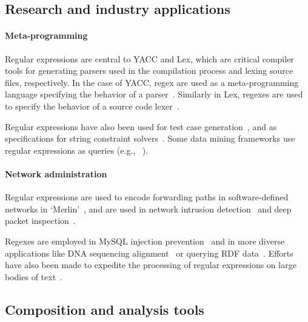 \subsection{Research and industry applications}
\paragraph{Meta-programming}  Regular expressions are central to YACC and Lex, which are critical compiler tools for generating parsers used in the compilation process and lexing source files, respectively.  In the case of YACC, regex are used as a meta-programming language specifying the behavior of a parser~\citep{YACCManual}.  Similarly in Lex, regexes are used to specify the behavior of a source code lexer~\citep{LexManual}.

Regular expressions have also been used for test case generation~\cite{Ghosh:2013:JAT:2486788.2486925, Galler:2014:STD:2683035.2683100, Anand:2013:OSM:2503903.2503991, Tillmann:2014:TAT:2642937.2642941},  and as specifications for string constraint solvers~\cite{Trinh:2014:SSS:2660267.2660372, hampi}.  Some data mining frameworks use regular expressions as queries (e.g., ~\cite{Begel:2010:CDE:1806799.1806821}).

\paragraph{Network administration} Regular expressions are used to encode forwarding paths in software-defined networks in `Merlin'~\cite{Soule:2014:MLP:2674005.2674989}, and are used in network intrusion detection~\cite{network,Sommer:2003:EBN:948109.948145} and deep packet inspection~\cite{Kumar:2006:AAM:1151659.1159952,Yu:2006:FMR:1185347.1185360}.

Regexes are employed in MySQL injection prevention~\cite{Yeole:2011:ADT:1980022.1980229} and in more diverse applications like DNA sequencing alignment~\cite{1594922} or querying RDF data~\cite{Lee:2010:PSQ:1871871.1871877, Alkhateeb:2009:ESR:1540656.1540975}.  Efforts have also been made to expedite the processing of regular expressions on large bodies of text~\cite{Baeza-Yates:1996:FTS:235809.235810}.

\subsection{Composition and analysis tools}
